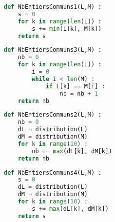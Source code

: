 \documentclass[a4paper, 11pt,reqno]{article}
\begin{document}
\begin{exercice}
\begin{enumerate}
\begin{minipage}{.45\textwidth}
\begin{lstlisting}[language=Python]
def NbEntiersCommuns1(L,M) :
    s = 0
    for k in range(len(L)) :
        s += min(L[k], M[k])
    return s
\end{lstlisting}
\begin{lstlisting}[language=Python]
def NbEntiersCommuns3(L,M) :
    nb = 0
    for k in range(len(L)) :
        i = 0
        while i < len(M) :
            if L[k] == M[i] :
                nb = nb + 1
    return nb
\end{lstlisting}
\end{minipage}
\hspace{.5cm}
\begin{minipage}{.45\textwidth}
\begin{lstlisting}[language=Python]
def NbEntiersCommuns2(L,M) :
    nb = 0
    dL = distribution(L)
    dM = distribution(M)
    for k in range(10) :
        nb += max(dL[k], dM[k])
    return nb
\end{lstlisting}
\begin{lstlisting}[language=Python]
def NbEntiersCommuns4(L,M) :
    s = 0
    dL = distribution(L)
    dM = distribution(M)
    for k in range(10) :
        s += max(dL[k], dM[k])
    return s
\end{lstlisting}
\end{minipage}

%

\end{enumerate}

\end{exercice}
\end{document}
